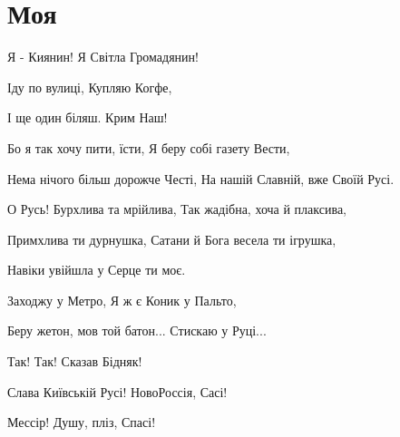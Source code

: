  
 


\chapter{Моя}

Я - Киянин!
Я Світла Громадянин!

Іду по вулиці,
Купляю Когфе,

І ще один біляш. Крим Наш!

Бо я так хочу пити, їсти,
Я беру собі газету Вести,

Нема нічого більш дорожче Честі,
На нашій Славній, вже Своїй Русі.

О Русь! Бурхлива та мрійлива,
Так жадібна, хоча й плаксива,

Примхлива ти дурнушка,
Сатани й Бога весела ти ігрушка,

Навіки увійшла у Серце ти моє.

Заходжу у Метро,
Я ж є Коник у Пальто,

Беру жетон, мов той батон...
Стискаю у Руці...

Так! Так! Сказав Бідняк!

Слава Київській Русі! НовоРоссія, Сасі!

Мессір! Душу, пліз, Спасі!





